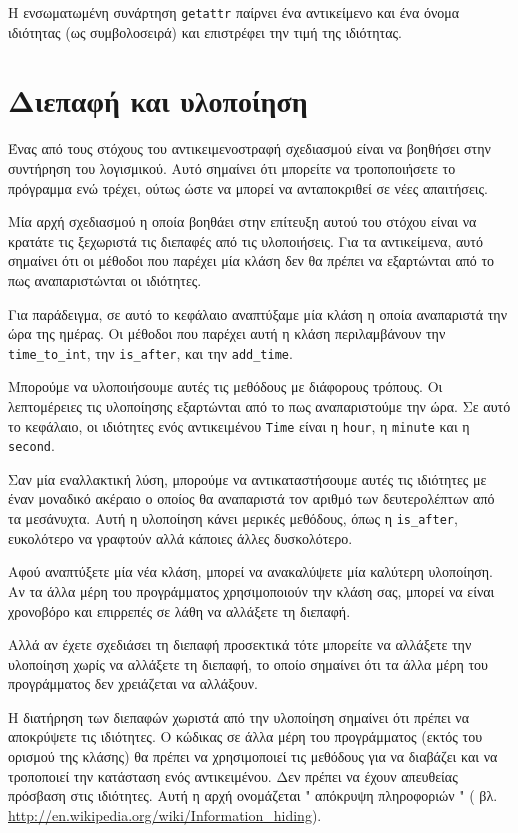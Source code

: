 \documentclass[10pt]{book}
\begin{document}
Η ενσωματωμένη συνάρτηση  {\tt getattr}  παίρνει ένα αντικείμενο και ένα όνομα ιδιότητας (ως συμβολοσειρά) και επιστρέφει την τιμή της ιδιότητας.


\section{Διεπαφή και υλοποίηση}

Ένας από τους στόχους του αντικειμενοστραφή σχεδιασμού είναι να βοηθήσει στην συντήρηση του λογισμικού.  Αυτό 
σημαίνει ότι μπορείτε να τροποποιήσετε το πρόγραμμα ενώ τρέχει, ούτως ώστε να μπορεί να ανταποκριθεί σε νέες απαιτήσεις.

Μία αρχή σχεδιασμού η οποία βοηθάει στην επίτευξη αυτού του στόχου είναι να κρατάτε τις ξεχωριστά τις 
διεπαφές από τις υλοποιήσεις.  Για τα αντικείμενα, αυτό σημαίνει ότι οι μέθοδοι που παρέχει μία κλάση 
δεν θα πρέπει να εξαρτώνται από το πως αναπαριστώνται οι ιδιότητες.

Για παράδειγμα, σε αυτό το κεφάλαιο αναπτύξαμε μία κλάση η οποία αναπαριστά την ώρα της ημέρας.  
Οι μέθοδοι που παρέχει αυτή η κλάση περιλαμβάνουν την  \verb"time_to_int",  την  \verb"is_after",  και την   \verb"add_time".

 Μπορούμε να υλοποιήσουμε αυτές τις μεθόδους με διάφορους τρόπους.  Οι λεπτομέρειες τις υλοποίησης εξαρτώνται από 
το πως αναπαριστούμε την ώρα.  Σε αυτό το κεφάλαιο, οι ιδιότητες ενός αντικειμένου  {\tt Time}  είναι η  
{\tt hour},  η  {\tt minute}  και η  {\tt second}.

 Σαν μία εναλλακτική λύση, μπορούμε να αντικαταστήσουμε αυτές τις ιδιότητες με έναν μοναδικό ακέραιο ο οποίος 
θα αναπαριστά τον αριθμό των δευτερολέπτων από τα μεσάνυχτα.  Αυτή η υλοποίηση κάνει μερικές μεθόδους, όπως η 
 \verb"is_after",  ευκολότερο να γραφτούν αλλά κάποιες άλλες δυσκολότερο.

Αφού αναπτύξετε μία νέα κλάση, μπορεί να ανακαλύψετε μία καλύτερη υλοποίηση.  Αν τα άλλα μέρη του προγράμματος χρησιμοποιούν 
την κλάση σας, μπορεί να είναι χρονοβόρο και επιρρεπές σε λάθη να αλλάξετε τη διεπαφή.

Αλλά αν έχετε σχεδιάσει τη διεπαφή προσεκτικά τότε μπορείτε να αλλάξετε την υλοποίηση χωρίς να αλλάξετε τη διεπαφή, 
το οποίο σημαίνει ότι τα άλλα μέρη του προγράμματος δεν χρειάζεται να αλλάξουν.

Η διατήρηση των διεπαφών χωριστά από την υλοποίηση σημαίνει ότι πρέπει να αποκρύψετε τις ιδιότητες.  Ο κώδικας σε 
άλλα μέρη του προγράμματος (εκτός του ορισμού της κλάσης) θα πρέπει να χρησιμοποιεί τις μεθόδους για να διαβάζει 
και να τροποποιεί την κατάσταση ενός αντικειμένου.  Δεν πρέπει να έχουν απευθείας πρόσβαση στις ιδιότητες.  Αυτή η 
αρχή ονομάζεται  " απόκρυψη πληροφοριών " ( βλ. \url{http://en.wikipedia.org/wiki/Information_hiding}).
\end{document}
